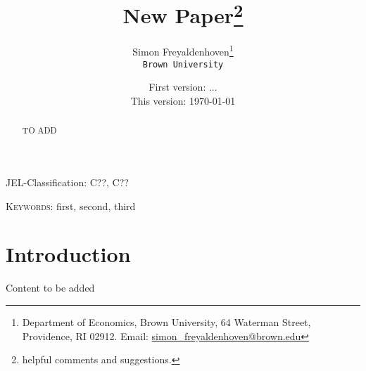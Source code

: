 \documentclass[11pt]{article}
\title{New Paper\thanks{helpful comments and suggestions.}}
\author{Simon Freyaldenhoven\thanks{Department of Economics, Brown University, 64 Waterman Street, Providence, RI 02912. Email: \href{mailto:simon_freyaldenhoven@brown.edu}{simon\_freyaldenhoven@brown.edu}}\\
\texttt{Brown University}}
\date{First version: ... \\ This version: \today }
\begin{document}
\maketitle

\begin{abstract}
\noindent TO ADD
\end{abstract}

JEL-Classification: C??, C??

\textsc{Keywords}:  first, second, third



\thispagestyle{empty}


\newpage
\setcounter{page}{1}


\section{Introduction}

Content to be added



\clearpage



\end{document}
